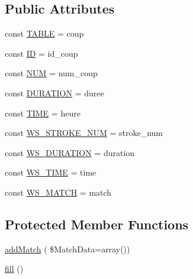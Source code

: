 \subsection*{Public Attributes}
\begin{DoxyCompactItemize}
\item 
const \hyperlink{class_m3_stroke_acf45f0322381e34882812c24a7e5c03a}{T\+A\+B\+LE} = \textquotesingle{}coup\textquotesingle{}
\item 
const \hyperlink{class_m3_stroke_a69dd61b8d3643b82cc88fe2c7769b73e}{ID} = \textquotesingle{}id\+\_\+coup\textquotesingle{}
\item 
const \hyperlink{class_m3_stroke_af5f8d0256e0cc0bc2cda662f66b8dbdd}{N\+UM} = \textquotesingle{}num\+\_\+coup\textquotesingle{}
\item 
const \hyperlink{class_m3_stroke_a4842220b512297d8ca535ff72de2a8e4}{D\+U\+R\+A\+T\+I\+ON} = \textquotesingle{}duree\textquotesingle{}
\item 
const \hyperlink{class_m3_stroke_a9343eac5bb4d02af023037a5e291dc15}{T\+I\+ME} = \textquotesingle{}heure\textquotesingle{}
\item 
const \hyperlink{class_m3_stroke_ac14351eb2eee8d5cf56f45b514731563}{W\+S\+\_\+\+S\+T\+R\+O\+K\+E\+\_\+\+N\+UM} = \textquotesingle{}stroke\+\_\+num\textquotesingle{}
\item 
const \hyperlink{class_m3_stroke_af61ac49a60735e49327ac3f05bbebec4}{W\+S\+\_\+\+D\+U\+R\+A\+T\+I\+ON} = \textquotesingle{}duration\textquotesingle{}
\item 
const \hyperlink{class_m3_stroke_aca12eac4d24e485adec1e746a84f94a1}{W\+S\+\_\+\+T\+I\+ME} = \textquotesingle{}time\textquotesingle{}
\item 
const \hyperlink{class_m3_stroke_ab61b95e4c61ad8aa6e729a69b20b4010}{W\+S\+\_\+\+M\+A\+T\+CH} = \textquotesingle{}match\textquotesingle{}
\end{DoxyCompactItemize}
\subsection*{Protected Member Functions}
\begin{DoxyCompactItemize}
\item 
\hyperlink{class_m3_stroke_a09dcfb9dfcbd8dc99b3acd0fe3b378b7}{add\+Match} ( \$Match\+Data=array())
\item 
\hyperlink{class_m3_stroke_ae3f223178f7b4d5fc817604242d06a63}{fill} ()
\end{DoxyCompactItemize}
